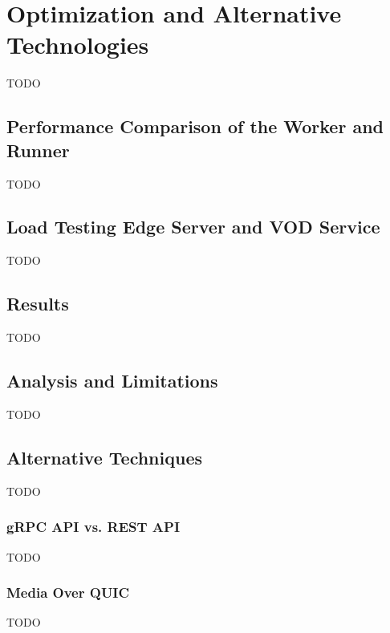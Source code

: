 
\chapter{Optimization and Alternative Technologies}\label{chapter:optimization_and_alternative_technologies}
TODO

\section{Performance Comparison of the Worker and Runner}
TODO

\section{Load Testing Edge Server and VOD Service}
TODO

\section{Results}
TODO

\section{Analysis and Limitations}
TODO

\section{Alternative Techniques}
TODO

\subsection{gRPC API vs. REST API}
TODO

\subsection{Media Over QUIC}
TODO
